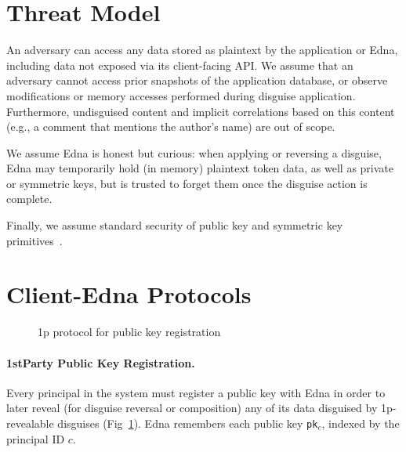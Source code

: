 \section{Threat Model}
An adversary can access any data stored as plaintext by the application or Edna, including data not exposed via its
client-facing API. We assume that an adversary cannot access prior snapshots of the application database, or observe modifications or memory accesses performed during disguise application. Furthermore, undisguised content and implicit correlations based on this content (e.g., a comment that mentions the author’s name) are out of scope.

We assume Edna is honest but curious: when applying or reversing a disguise, Edna may temporarily
hold (in memory) plaintext token data, as well as private or symmetric keys, but is trusted to
forget them once the disguise action is complete.  

Finally, we assume standard security of public key and
symmetric key primitives~.

\section{Client-Edna Protocols}

\begin{figure}[h!]
\caption{1p protocol for public key registration}
\label{fig:acctreg}
\end{figure}

\paragraph{1stParty Public Key Registration.}
Every principal in the system must register a public key with Edna in order to later reveal (for
disguise reversal or composition) any of its data disguised by 1p-revealable disguises
(Fig~\ref{fig:acctreg}). Edna remembers each public key \texttt{pk}$_c$, indexed by the 
principal ID $c$.

